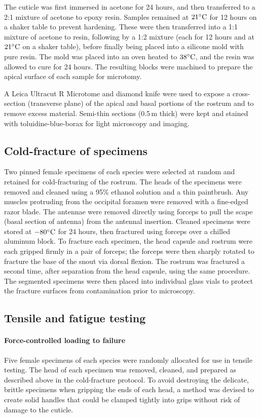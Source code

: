 \documentclass[twocolumn, linenumbers, superscriptaddress, nofootinbib]{revtex4-1}
\begin{document}
			The cuticle was first immersed in acetone for 24 hours, and then transferred to a 2:1 mixture of acetone to epoxy resin.
			Samples remained at $21\degree\text{C}$ for 12 hours on a shaker table to prevent hardening.
			These were then transferred into a 1:1 mixture of acetone to resin, following by a 1:2 mixture (each for 12 hours and at $21\degree\text{C}$ on a shaker table), before finally being placed into a silicone mold with pure resin.
			The mold was placed	into an oven heated to $38\degree\text{C}$, and the resin was allowed to cure for 24 hours.
			The resulting blocks were machined to prepare the apical surface of each
			sample for microtomy.
			
			A Leica Ultracut R Microtome and diamond knife were used to expose a cross-section (transverse plane) of the apical and basal portions of the rostrum and to remove excess material.
			Semi-thin sections (0.5\,{\textmu}m thick) were kept and stained with
			toluidine-blue-borax for light microscopy and imaging.
			
		\subsection*{Cold-fracture of specimens}
			Two pinned female specimens of each species were selected at random and retained for cold-fracturing of the rostrum.
			The heads of the specimens were removed and cleaned using a 95\% ethanol solution and a thin paintbrush.
			Any muscles protruding from the occipital foramen were removed with a fine-edged razor blade.
			The antennae were removed directly using forceps to pull the scape (basal section of antenna) from the antennal insertion.
			Cleaned specimens were stored at $-80\degree\text{C}$ for 24 hours, then fractured using forceps over a chilled aluminum block.
			To fracture each specimen, the head capsule and rostrum were each gripped firmly in a pair of forceps; the forceps were then sharply rotated to fracture the base of the snout via dorsal flexion.
			The rostrum was fractured a second time, after separation from the head capsule, using the same procedure.
			The segmented specimens were then placed into individual glass vials to protect the fracture surfaces from contamination prior to microscopy.
			
		\subsection*{Tensile and fatigue testing}
			\paragraph*{Force-controlled loading to failure}
				Five female specimens of each species were randomly allocated for use in tensile testing.
				The head of each specimen was removed, cleaned, and prepared as described above in the cold-fracture protocol.
				To avoid destroying the delicate, brittle specimens when gripping the ends of each head, a method was devised to create solid handles that could be clamped tightly into grips without risk of damage to the cuticle.
				
\end{document}
